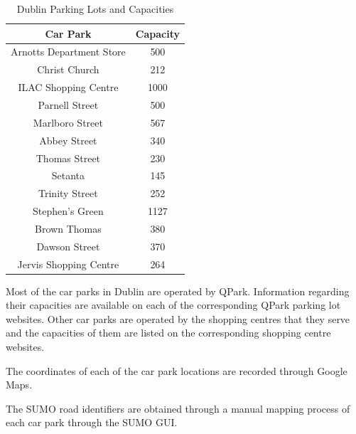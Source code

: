 \begin{table}[H]
    \begin{center}
        \begin{tabular}{||c c||} 
            \hline
            Car Park & Capacity\\ [0.5ex] 
            \hline\hline
            Arnotts Department Store & 500\\ 
            \hline
            Christ Church &  212\\
            \hline
            ILAC Shopping Centre & 1000 \\
            \hline
            Parnell Street & 500 \\
            \hline
            Marlboro Street & 567 \\
            \hline
            Abbey Street & 340 \\
            \hline
            Thomas Street & 230 \\
            \hline
            Setanta & 145 \\
            \hline
            Trinity Street & 252 \\
            \hline
            Stephen's Green & 1127 \\
            \hline
            Brown Thomas & 380 \\
            \hline
            Dawson Street & 370 \\
            \hline
            Jervis Shopping Centre & 264\\ [1ex]
            \hline
        \end{tabular}
        \caption{Dublin Parking Lots and Capacities}
        \label{table:carpark}
    \end{center}
\end{table}

Most of the car parks in Dublin are operated by QPark. Information regarding their capacities are available on each of the corresponding QPark parking lot websites. Other car parks are operated by the shopping centres that they serve and the capacities of them are listed on the corresponding shopping centre websites.

The coordinates of each of the car park locations are recorded through Google Maps.

The SUMO road identifiers are obtained through a manual mapping process of each car park through the SUMO GUI.
